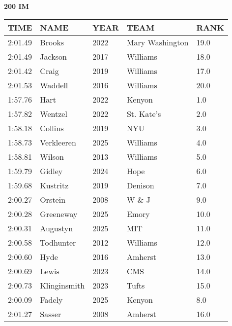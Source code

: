 \begin{minipage}[t]{0.48\textwidth}
\centering
\textbf{200 IM}\\[0.05cm]
\begin{tabular}{@{}p{1.8cm}p{2.8cm}p{1.2cm}p{1.4cm}p{0.8cm}@{}}
\hline
\textbf{TIME} & \textbf{NAME} & \textbf{YEAR} & \textbf{TEAM} & \textbf{RANK} \\
\hline
2:01.49 & Brooks & 2022 & Mary Washington & 19.0 \\
2:01.49 & Jackson & 2017 & Williams & 18.0 \\
2:01.42 & Craig & 2019 & Williams & 17.0 \\
2:01.53 & Waddell & 2016 & Williams & 20.0 \\
1:57.76 & Hart & 2022 & Kenyon & 1.0 \\
1:57.82 & Wentzel & 2022 & St. Kate's & 2.0 \\
1:58.18 & Collins & 2019 & NYU & 3.0 \\
1:58.73 & Verkleeren & 2025 & Williams & 4.0 \\
1:58.81 & Wilson & 2013 & Williams & 5.0 \\
1:59.79 & Gidley & 2024 & Hope & 6.0 \\
1:59.68 & Kustritz & 2019 & Denison & 7.0 \\
2:00.27 & Orstein & 2008 & W \& J & 9.0 \\
2:00.28 & Greeneway & 2025 & Emory & 10.0 \\
2:00.31 & Augustyn & 2025 & MIT & 11.0 \\
2:00.58 & Todhunter & 2012 & Williams & 12.0 \\
2:00.60 & Hyde & 2016 & Amherst & 13.0 \\
2:00.69 & Lewis & 2023 & CMS & 14.0 \\
2:00.73 & Klinginsmith & 2023 & Tufts & 15.0 \\
2:00.09 & Fadely & 2025 & Kenyon & 8.0 \\
2:01.27 & Sasser & 2008 & Amherst & 16.0 \\
\hline
\end{tabular}
\end{minipage}

\vspace{0.4cm}

